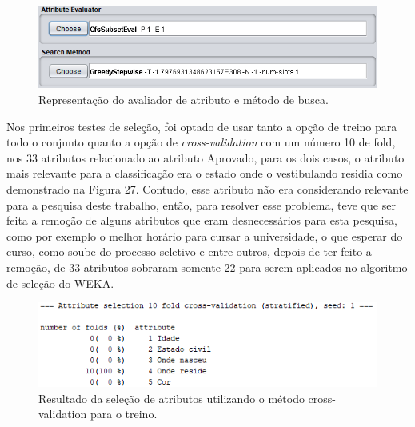 \par
\begin{figure}[!htp]
	\begin{center}
    \caption{\label{fig:waveform_fig} Representação do avaliador de atributo e método de busca.}
	\includegraphics[scale=0.90]{Figuras/Avaliador_de_atributo.png}
	\end{center}
\end{figure}

\par
Nos primeiros testes de seleção, foi optado de usar tanto a opção de treino para todo o conjunto quanto a opção de \textit{cross-validation} com um número 10 de fold, nos 33 atributos relacionado ao atributo Aprovado, para os dois casos, o atributo mais relevante para a classificação era o estado onde o vestibulando residia como demonstrado na Figura 27. Contudo, esse atributo não era considerando relevante para a pesquisa deste trabalho, então, para resolver esse problema, teve que ser feita a remoção de alguns atributos que eram desnecessários para esta pesquisa, como por exemplo o melhor horário para cursar a universidade, o que esperar do curso, como soube do processo seletivo e entre outros, depois de ter feito a remoção, de 33 atributos sobraram somente 22 para serem aplicados no algoritmo de seleção do WEKA.

\par
\begin{figure}[!htp]
	\begin{center}
    \caption{\label{fig:waveform_fig} Resultado da seleção de atributos utilizando o método cross-validation para o treino.}
	\includegraphics[scale=0.99]{Figuras/33_atributos.png}
	\end{center}
\end{figure}


